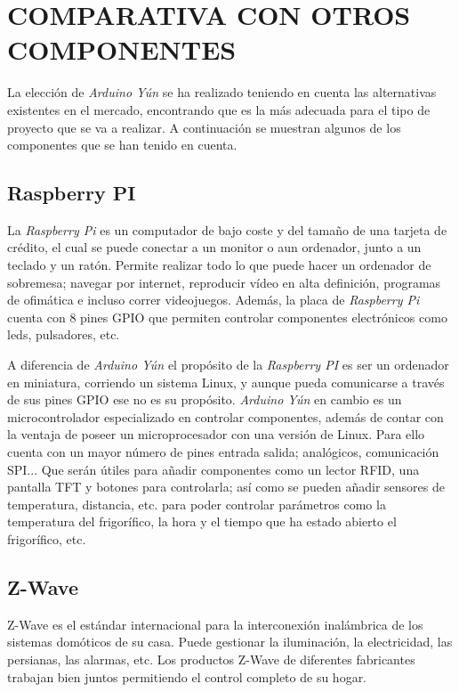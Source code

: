 \section{COMPARATIVA CON OTROS COMPONENTES}

La elección de \emph{Arduino Yún} se ha realizado teniendo en cuenta las alternativas existentes en el mercado, encontrando que es la más adecuada para el tipo de proyecto que se va a realizar. A continuación se muestran algunos de los componentes que se han tenido en cuenta.

\subsection{Raspberry PI}


La \emph{Raspberry Pi} es un computador de bajo coste y del tamaño de una tarjeta de crédito, el cual se puede conectar a un monitor o aun ordenador, junto a un teclado y un ratón. Permite realizar todo lo que puede hacer un ordenador de sobremesa; navegar por internet, reproducir vídeo en alta definición, programas de ofimática e incluso correr videojuegos. Además, la placa de \emph{Raspberry Pi} cuenta con 8 pines GPIO que permiten controlar componentes electrónicos como leds, pulsadores, etc.

A diferencia de \emph{Arduino Yún} el propósito de la \emph{Raspberry PI} es ser un ordenador en miniatura, corriendo un sistema Linux, y aunque pueda comunicarse a través de sus pines GPIO ese no es su propósito. \emph{Arduino Yún} en cambio es un microcontrolador especializado en controlar componentes, además de contar con la ventaja de poseer un microprocesador con una versión de Linux. Para ello cuenta con un mayor número de pines entrada salida; analógicos, comunicación SPI... Que serán útiles para añadir componentes como un lector RFID, una pantalla TFT y botones para controlarla; así como se pueden añadir sensores de temperatura, distancia, etc. para poder controlar parámetros como la temperatura del frigorífico, la hora y el tiempo que ha estado abierto el frigorífico, etc.

\subsection{Z-Wave}

Z-Wave es el estándar internacional para la interconexión inalámbrica de los sistemas domóticos de su casa. Puede gestionar  la iluminación, la electricidad, las persianas, las alarmas, etc. Los productos Z-Wave de diferentes fabricantes trabajan bien juntos permitiendo el control completo de su hogar.

